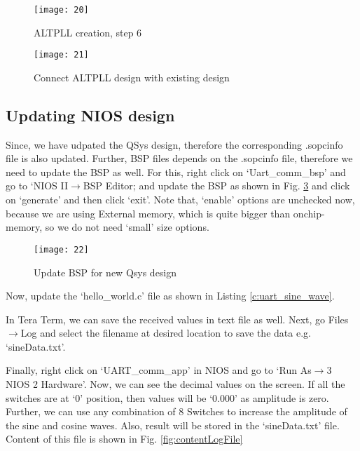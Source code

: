 \begin{figure}[!h]
	\centering
	\texttt{[image: 20]}
	\caption{ALTPLL creation, step 6}
	\label{fig:altpllCreation6}
\end{figure}

\begin{figure}[!h]
	\centering
	\texttt{[image: 21]}
	\caption{Connect ALTPLL design with existing design}
	\label{fig:altpllCreation7}
\end{figure}

\subsection{Updating NIOS design}
Since, we have udpated the QSys design, therefore the corresponding .sopcinfo file is also updated. Further, BSP files depends on the .sopcinfo file, therefore we need to update the BSP as well. For this, right click on `Uart\_comm\_bsp' and go to `NIOS II$\rightarrow$BSP Editor; and update the BSP as shown in Fig. \ref{fig:updateBSPDRAM} and click on `generate' and then click `exit'. Note that, `enable' options are unchecked now, because we are using External memory, which is quite bigger than onchip-memory, so we do not need `small' size options. 

\begin{figure}[!h]
	\centering
	\texttt{[image: 22]}
	\caption{Update BSP for new Qsys design}
	\label{fig:updateBSPDRAM}
\end{figure}

Now, update the `hello\_world.c' file as shown in Listing \ref{c:uart_sine_wave}. 



In Tera Term, we can save the received values in text file as well. Next, go Files$\rightarrow$Log and select the filename at desired location to save the data e.g. `sineData.txt'. 

Finally, right click on `UART\_comm\_app' in NIOS and go to `Run As$\rightarrow$3 NIOS 2 Hardware'. Now, we can see the decimal values on the screen. If all the switches are at `0' position, then values will be `0.000' as amplitude is zero. Further, we can use any combination of 8 Switches to increase the amplitude of the sine and cosine waves. Also, result will be stored in the  `sineData.txt' file. Content of this file is shown in Fig. \ref{fig:contentLogFile}


